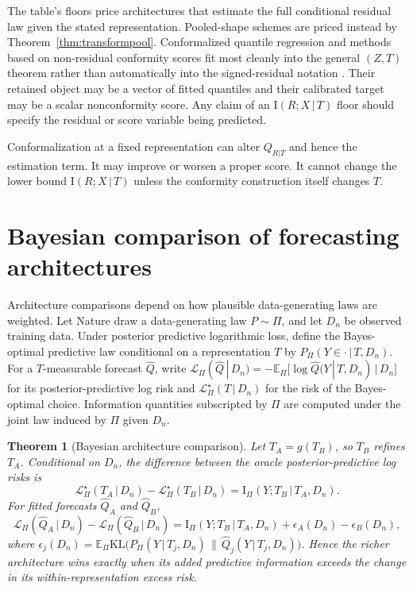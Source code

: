\documentclass[11pt]{article}
\newtheorem{theorem}{Theorem}
\theoremstyle{remark}
\newcommand{\E}{\mathbb{E}}
\newcommand{\KL}{\mathrm{KL}}
\newcommand{\I}{\mathrm{I}}
\newcommand{\given}{\,|\,}
\newcommand{\Dn}{D_n}
\newcommand{\Loss}{\mathcal{L}}
\begin{document}
The table's floors price architectures that estimate the full conditional residual law given
the stated representation. Pooled-shape schemes are priced instead by
Theorem~\ref{thm:transformpool}. Conformalized quantile regression and methods based on
non-residual conformity scores fit most
cleanly into the general $(Z,T)$ theorem rather than automatically into the signed-residual
notation \citep{romano2019conformalized,chernozhukov2021distributional}. Their retained object
may be a vector of fitted quantiles and their calibrated target may be a scalar nonconformity
score. Any claim of an $\I(R;X\given T)$ floor should specify the residual or score variable
being predicted.

Conformalization at a fixed representation can alter $Q_{R|T}$ and hence the estimation term. It
may improve or worsen a proper score. It cannot change the lower bound $\I(R;X\given T)$ unless
the conformity construction itself changes $T$.

\section{Bayesian comparison of forecasting architectures}\label{sec:comparison}

Architecture comparisons depend on how plausible data-generating laws are weighted. Let
Nature draw a data-generating law $P\sim\Pi$, and let $\Dn$ be observed training data. Under
posterior predictive logarithmic loss, define the Bayes-optimal predictive law conditional on a
representation $T$ by $P_\Pi(Y\in\cdot\given T,\Dn)$. For a $T$-measurable forecast
$\widehat Q$, write
$\Loss_\Pi(\widehat Q\given\Dn)=-\E_\Pi\big[\log\widehat Q(Y\given T,\Dn)\given\Dn\big]$
for its posterior-predictive log risk and $\Loss^\star_\Pi(T\given\Dn)$ for the risk of the
Bayes-optimal choice. Information quantities subscripted by $\Pi$ are computed under the
joint
law induced by $\Pi$ given $\Dn$.

\begin{theorem}[Bayesian architecture comparison]\label{thm:bayes}
Let $T_A=g(T_B)$, so $T_B$ refines $T_A$. Conditional on $\Dn$, the difference between the
oracle posterior-predictive log risks is
\begin{equation}\label{eq:bayesoracle}
\Loss^\star_\Pi(T_A\given\Dn)-\Loss^\star_\Pi(T_B\given\Dn)
=\I_\Pi(Y;T_B\given T_A,\Dn).
\end{equation}
For fitted forecasts $\widehat Q_A$ and $\widehat Q_B$,
\begin{equation}\label{eq:bayesfitted}
\Loss_\Pi(\widehat Q_A\given\Dn)-\Loss_\Pi(\widehat Q_B\given\Dn)
=\I_\Pi(Y;T_B\given T_A,\Dn)+\epsilon_A(\Dn)-\epsilon_B(\Dn),
\end{equation}
where
$\epsilon_j(\Dn)=\E_\Pi\KL\big(P_\Pi(Y\given T_j,\Dn)\,\|\,\widehat Q_j(Y\given T_j,\Dn)\big)$.
Hence the richer architecture wins exactly when its added predictive information exceeds the
change in its within-representation excess risk.
\end{theorem}
\end{document}
